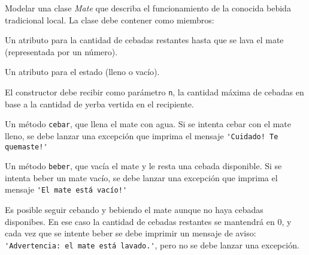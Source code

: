 \begin{ejercicio}
Modelar una clase \emph{Mate} que describa el funcionamiento de la
conocida bebida tradicional local. La clase debe contener como miembros:
\begin{partes}
    \item Un atributo para la cantidad de cebadas restantes hasta que se lava
el mate (representada por un número).
    \item Un atributo para el estado (lleno o vacío).
    \item El constructor debe recibir como parámetro \verb!n!, la cantidad
máxima de cebadas en base a la cantidad de yerba vertida en el recipiente.
    \item Un método \verb!cebar!, que llena el mate con agua. Si se intenta
cebar con el mate lleno, se debe lanzar una excepción que imprima el
mensaje \lstinline|'Cuidado! Te quemaste!'|
    \item Un método \verb!beber!, que vacía el mate y le resta una cebada
disponible. Si se intenta beber un mate vacío, se debe lanzar una excepción
que imprima el mensaje \lstinline|'El mate está vacío!'|
    \item Es posible seguir cebando y bebiendo el mate aunque no haya cebadas
disponibes. En ese caso la cantidad de cebadas restantes se mantendrá
en 0, y cada vez que se intente beber se debe imprimir un mensaje de
aviso: \lstinline|'Advertencia: el mate está lavado.'|, pero no se debe lanzar una
excepción.
\end{partes}
\end{ejercicio}

